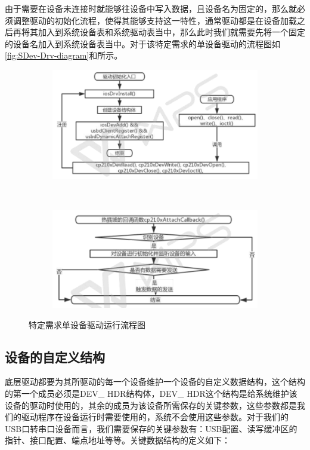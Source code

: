 	由于需要在设备未连接时就能够往设备中写入数据，且设备名为固定的，那么就必须调整驱动的初始化流程，使得其能够支持这一特性，通常驱动都是在设备加载之后再将其加入到系统设备表和系统驱动表当中，那么此时我们就需要先将一个固定的设备名加入到系统设备表当中。对于该特定需求的单设备驱动的流程图如\autoref{fig:SDev-Drv-diagram}和所示。
\begin{figure}[h]
\centering
  \begin{subfigure}[b]{1.0\textwidth}
  \includegraphics[width=\textwidth]{./graphics/SDev-Drv-Diagram-a.pdf}
  \caption{}\label{fig:SDevice-Driver-diagram-a}
  \end{subfigure}
  ~
  \begin{subfigure}[b]{1.0\textwidth}
  \includegraphics[width=\textwidth]{./graphics/SDev-Drv-Diagram-b.pdf}
  \caption{}\label{fig:SDevice-Driver-diagram-b}
  \end{subfigure}
\caption{特定需求单设备驱动运行流程图}\label{fig:SDev-Drv-diagram}
\end{figure}




\subsection{设备的自定义结构}
	底层驱动都要为其所驱动的每一个设备维护一个设备的自定义数据结构，这个结构的第一个成员必须是DEV\_ HDR结构体，DEV\_ HDR这个结构是给系统维护该设备的驱动时使用的，其余的成员为该设备所需保存的关键参数，这些参数都是我们的驱动程序在设备运行时需要使用的，系统不会使用这些参数。对于我们的USB口转串口设备而言，我们需要保存的关键参数有：USB配置、读写缓冲区的指针、接口配置、端点地址等等。关键数据结构的定义如下： 
	
